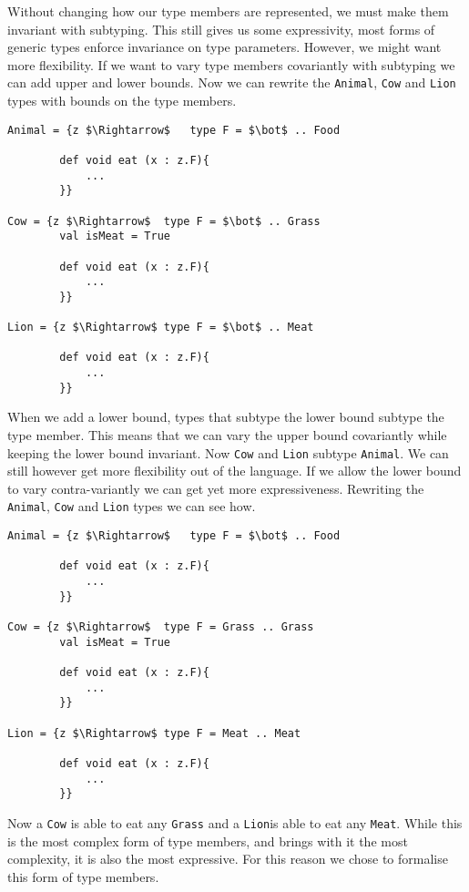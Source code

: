 \documentclass[11pt
              , a4paper
              , twoside
              , openright
              ]{report}
\numberwithin{case}{theorem}
\numberwithin{subcase}{case}
\begin{document}
Without changing how our type members are represented, we must make them invariant with subtyping. This still gives us some expressivity, most forms of generic types enforce invariance on type parameters. However, we might want more flexibility. If we want to vary type members covariantly with subtyping we can add upper and lower bounds. Now we can rewrite the \verb|Animal|, \verb|Cow| and \verb|Lion| types with bounds on the type members.
\begin{lstlisting}[mathescape, style=customlang]
Animal = {z $\Rightarrow$	type F = $\bot$ .. Food
		
		def void eat (x : z.F){
			...
		}}
		
Cow = {z $\Rightarrow$	type F = $\bot$ .. Grass
		val isMeat = True
		
		def void eat (x : z.F){
			...
		}}

Lion = {z $\Rightarrow$	type F = $\bot$ .. Meat
		
		def void eat (x : z.F){
			...
		}}
\end{lstlisting}
When we add a lower bound, types that subtype the lower bound subtype the type member. This means that we can vary the upper bound covariantly while keeping the lower bound invariant. Now \verb|Cow| and \verb|Lion| subtype \verb|Animal|. We can still however get more flexibility out of the language. If we allow the lower bound to vary contra-variantly we can get yet more expressiveness. Rewriting the  \verb|Animal|, \verb|Cow| and \verb|Lion| types we can see how.
\begin{lstlisting}[mathescape, style=customlang]
Animal = {z $\Rightarrow$	type F = $\bot$ .. Food
		
		def void eat (x : z.F){
			...
		}}
		
Cow = {z $\Rightarrow$	type F = Grass .. Grass
		val isMeat = True
		
		def void eat (x : z.F){
			...
		}}

Lion = {z $\Rightarrow$	type F = Meat .. Meat
		
		def void eat (x : z.F){
			...
		}}
\end{lstlisting}
Now a \verb|Cow| is able to eat any \verb|Grass| and a \verb|Lion|is able to eat any \verb|Meat|. While this is the most complex form of type members, and brings with it the most complexity, it is also the most expressive. For this reason we chose to formalise this form of type members.
\end{document}
